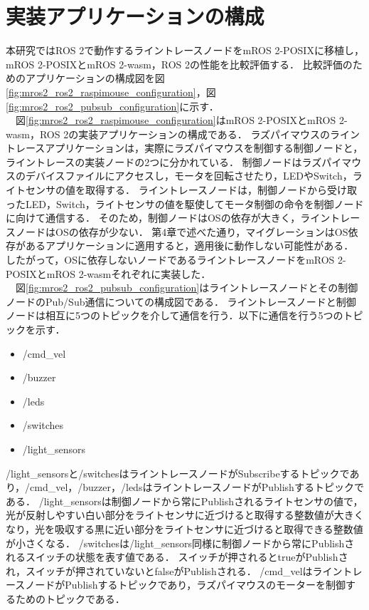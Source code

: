 \section{実装アプリケーションの構成}
本研究ではROS 2で動作するライントレースノードをmROS 2-POSIXに移植し，mROS 2-POSIXとmROS 2-wasm，ROS 2の性能を比較評価する．
比較評価のためのアプリケーションの構成図を図\ref{fig:mros2_ros2_raspimouse_configuration}，図\ref{fig:mros2_ros2_pubsub_configuration}に示す．
\\　図\ref{fig:mros2_ros2_raspimouse_configuration}はmROS 2-POSIXとmROS 2-wasm，ROS 2の実装アプリケーションの構成である．
ラズパイマウスのライントレースアプリケーションは，実際にラズパイマウスを制御する制御ノードと，ライントレースの実装ノードの2つに分かれている．
制御ノードはラズパイマウスのデバイスファイルにアクセスし，モータを回転させたり，LEDやSwitch，ライトセンサの値を取得する．
ライントレースノードは，制御ノードから受け取ったLED，Switch，ライトセンサの値を駆使してモータ制御の命令を制御ノードに向けて通信する．
そのため，制御ノードはOSの依存が大きく，ライントレースノードはOSの依存が少ない．
第4章で述べた通り，マイグレーションはOS依存があるアプリケーションに適用すると，適用後に動作しない可能性がある．
したがって，OSに依存しないノードであるライントレースノードをmROS 2-POSIXとmROS 2-wasmそれぞれに実装した．
\\　図\ref{fig:mros2_ros2_pubsub_configuration}はライントレースノードとその制御ノードのPub/Sub通信についての構成図である．
ライントレースノードと制御ノードは相互に5つのトピックを介して通信を行う．以下に通信を行う5つのトピックを示す．
\begin{itemize}
    \item /cmd\_vel
    \item /buzzer
    \item /leds
    \item /switches
    \item /light\_sensors    
\end{itemize}
/light\_sensorsと/switchesはライントレースノードがSubscribeするトピックであり，/cmd\_vel，/buzzer，/ledsはライントレースノードがPublishするトピックである．
/light\_sensorsは制御ノードから常にPublishされるライトセンサの値で，光が反射しやすい白い部分をライトセンサに近づけると取得する整数値が大きくなり，光を吸収する黒に近い部分をライトセンサに近づけると取得できる整数値が小さくなる．
/switchesは/light\_sensors同様に制御ノードから常にPublishされるスイッチの状態を表す値である．
スイッチが押されるとtrueがPublishされ，スイッチが押されていないとfalseがPublishされる．
/cmd\_velはライントレースノードがPublishするトピックであり，ラズパイマウスのモーターを制御するためのトピックである．
